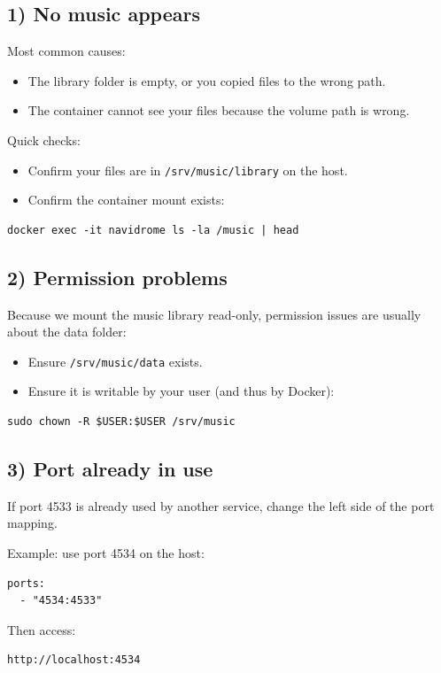 \subsection{1) No music appears}
Most common causes:
\begin{itemize}[leftmargin=*]
  \item The library folder is empty, or you copied files to the wrong path.
  \item The container cannot see your files because the volume path is wrong.
\end{itemize}

Quick checks:
\begin{itemize}[leftmargin=*]
  \item Confirm your files are in \texttt{/srv/music/library} on the host.
  \item Confirm the container mount exists:
\end{itemize}

\begin{lstlisting}
docker exec -it navidrome ls -la /music | head
\end{lstlisting}

\subsection{2) Permission problems}
Because we mount the music library read-only, permission issues are usually about the data folder:
\begin{itemize}[leftmargin=*]
  \item Ensure \texttt{/srv/music/data} exists.
  \item Ensure it is writable by your user (and thus by Docker):
\end{itemize}

\begin{lstlisting}
sudo chown -R $USER:$USER /srv/music
\end{lstlisting}

\subsection{3) Port already in use}
If port 4533 is already used by another service, change the left side of the port mapping.

Example: use port 4534 on the host:
\begin{lstlisting}
ports:
  - "4534:4533"
\end{lstlisting}

Then access:
\begin{lstlisting}
http://localhost:4534
\end{lstlisting}

